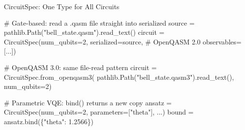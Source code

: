 \documentclass[
  ignorenonframetext,
  aspectratio=169,
]{beamer}
\newenvironment{Shaded}{\begin{snugshade}}{\end{snugshade}}
\newcommand{\CommentTok}[1]{\textcolor[rgb]{0.48,0.49,0.49}{#1}}
\newcommand{\DecValTok}[1]{\textcolor[rgb]{0.96,0.45,0.00}{#1}}
\newcommand{\FloatTok}[1]{\textcolor[rgb]{0.96,0.45,0.00}{#1}}
\newcommand{\NormalTok}[1]{\textcolor[rgb]{0.81,0.81,0.76}{#1}}
\newcommand{\OperatorTok}[1]{\textcolor[rgb]{0.81,0.81,0.76}{#1}}
\newcommand{\StringTok}[1]{\textcolor[rgb]{0.96,0.31,0.31}{#1}}
\begin{document}
\begin{frame}[fragile]{CircuitSpec: One Type for All Circuits}
\label{circuitspec-one-type-for-all-circuits}
\begin{Shaded}
\begin{Highlighting}[]
\CommentTok{\# Gate{-}based: read a .qasm file straight into \textasciigrave{}serialized\textasciigrave{}}
\NormalTok{source }\OperatorTok{=}\NormalTok{ pathlib.Path(}\StringTok{"bell\_state.qasm"}\NormalTok{).read\_text()}
\NormalTok{circuit }\OperatorTok{=}\NormalTok{ CircuitSpec(num\_qubits}\OperatorTok{=}\DecValTok{2}\NormalTok{, serialized}\OperatorTok{=}\NormalTok{source,   }\CommentTok{\# OpenQASM 2.0}
\NormalTok{                      observables}\OperatorTok{=}\NormalTok{[...])}

\CommentTok{\# OpenQASM 3.0: same file{-}read pattern}
\NormalTok{circuit }\OperatorTok{=}\NormalTok{ CircuitSpec.from\_openqasm3(}
\NormalTok{    pathlib.Path(}\StringTok{"bell\_state.qasm3"}\NormalTok{).read\_text(), num\_qubits}\OperatorTok{=}\DecValTok{2}\NormalTok{)}

\CommentTok{\# Parametric VQE: bind() returns a new copy}
\NormalTok{ansatz }\OperatorTok{=}\NormalTok{ CircuitSpec(num\_qubits}\OperatorTok{=}\DecValTok{2}\NormalTok{, parameters}\OperatorTok{=}\NormalTok{[}\StringTok{"theta"}\NormalTok{], ...)}
\NormalTok{bound  }\OperatorTok{=}\NormalTok{ ansatz.bind(\{}\StringTok{"theta"}\NormalTok{: }\FloatTok{1.2566}\NormalTok{\})}
\end{Highlighting}
\end{Shaded}
\end{frame}
\end{document}
